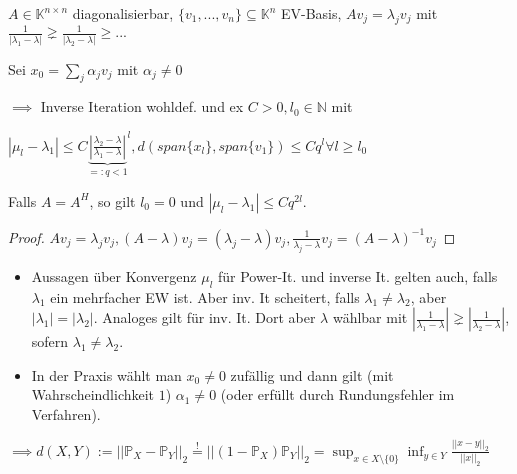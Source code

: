 \begin{corollary}
	$A \in \mathbb{K}^{n\times n}$ diagonalisierbar, $\{v_1, ..., v_n\} \subseteq \mathbb{K}^n$ EV-Basis, $Av_j = \lambda_j v_j$ mit $\frac{1}{|\lambda_1 - \lambda|} \gneq \frac{1}{|\lambda_2 - \lambda|} \geq ...$
	
	Sei $x_0 = \sum_j \alpha_j v_j$ mit $\alpha_j \neq 0$
	
	$\implies$ Inverse Iteration wohldef. und ex $C>0, l_0 \in \mathbb{N}$ mit
	
	$|\mu_l - \lambda_1| \leq C {\underbrace{\left|\frac{\lambda_2-\lambda}{\lambda_1-\lambda}\right|}_{=:q<1}}^l, d(span\{x_l\}, span\{v_1\}) \leq C q^l \forall l \geq l_0$
	
	Falls $A=A^H$, so gilt $l_0 = 0$ und $|\mu_l - \lambda_1| \leq C q^{2l}$.
\end{corollary}

\begin{proof}
	$Av_j = \lambda_j v_j, (A - \lambda)v_j = (\lambda_j - \lambda)v_j, \frac{1}{\lambda_j - \lambda}v_j = (A-\lambda)^{-1}v_j$
\end{proof}

\begin{remark}
	\begin{itemize}
		\item Aussagen über Konvergenz $\mu_l$ für Power-It. und inverse It. gelten auch, falls $\lambda_1$ ein mehrfacher EW ist. Aber inv. It scheitert, falls $\lambda_1 \neq \lambda_2$, aber $|\lambda_1| = |\lambda_2|$. Analoges gilt für inv. It. Dort aber $\lambda$ wählbar mit $\left|\frac{1}{\lambda_1 - \lambda}\right| \gneq \left|\frac{1}{\lambda_2 - \lambda}\right|$, sofern $\lambda_1 \neq \lambda_2$.
		\item In der Praxis wählt man $x_0 \neq 0$ zufällig und dann gilt (mit Wahrscheindlichkeit $1$) $\alpha_1 \neq 0$ (oder erfüllt durch Rundungsfehler im Verfahren).
	\end{itemize}	
\end{remark}

\begin{lemma}
	$\implies d(X,Y) := ||\mathbb{P}_X - \mathbb{P}_Y||_2 \overset{!}{=} ||(1-\mathbb{P}_X)\mathbb{P}_Y||_2 = \sup_{x\in X\setminus\{0\}} \inf_{y\in Y} \frac{||x-y||_2}{||x||_2}$
\end{lemma}

